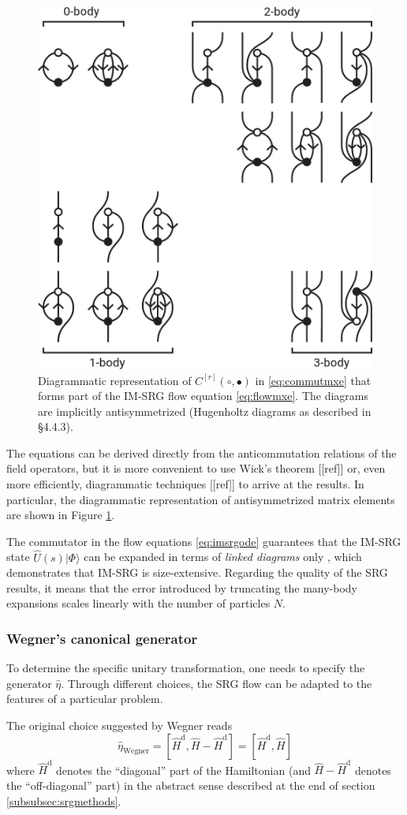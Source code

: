 \documentclass[amsmath, amssymb, aps, floatfix, nofootinbib, preprintnumbers,showpacs, superscriptaddress, twocolumn]{revtex4-1}
\newcommand{\ket}[1]{| #1 \rangle}
\begin{document}
\begin{figure}
\includegraphics[width=.48\textwidth]{fig-diagrams-imsrg}
\caption{Diagrammatic representation of $C^{[r]}(\circ, \bullet)$ in \eqref{eq:commutmxe} that forms part of the IM-SRG flow equation \eqref{eq:flowmxe}.  The diagrams are implicitly antisymmetrized (Hugenholtz diagrams \cite{HUGENHOLTZ1957481} as described in \cite{shavitt2009many} \S 4.4.3).}
\label{fig:diagrams-imsrg}
\end{figure}
The equations can be derived directly from the anticommutation relations of the field operators, but it is more convenient to use Wick's theorem [[ref]] or, even more efficiently, diagrammatic techniques [[ref]] to arrive at the results.  In particular, the diagrammatic representation of antisymmetrized matrix elements are shown in Figure \ref{fig:diagrams-imsrg}.

The commutator in the flow equations \eqref{eq:imsrgode} guarantees that the IM-SRG state $\hat U(s) \ket{\Phi}$ can be expanded in terms of \emph{linked diagrams} only \cite{shavitt2009many,ISI:A1981MN73700014}, which demonstrates that IM-SRG is size-extensive.  Regarding the quality of the SRG results, it means that the error introduced by truncating the many-body expansions scales linearly with the number of particles $N$.

\subsubsection{Wegner's canonical generator}

To determine the specific unitary transformation, one needs to specify the generator $\hat{\eta}$.  Through different choices, the SRG flow can be adapted to the features of a particular problem.

The original choice suggested by Wegner \cite{PhysRepWegner0} reads
\begin{equation}
  \hat{\eta}_{\text{Wegner}}
  = [\hat{H}^{\text{d}}, \hat{H} - \hat{H}^{\text{d}}]
  = [\hat{H}^{\text{d}}, \hat{H}]
  \label{eq:etaWegner}
\end{equation}
where $\hat{H}^{\text{d}}$ denotes the ``diagonal'' part of the Hamiltonian (and $\hat{H} - \hat{H}^{\text{d}}$ denotes the ``off-diagonal'' part) in the abstract sense described at the end of section \ref{subsubsec:srgmethods}.
\end{document}
